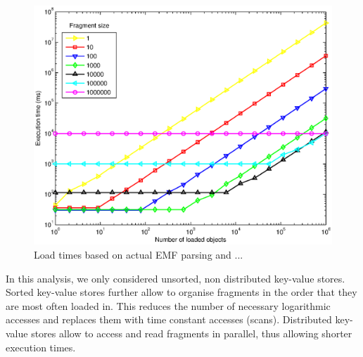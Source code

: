 \begin{figure}
\centering
\includegraphics[width=0.65\linewidth]{figures/fragTheory}
\caption{Load times based on actual EMF parsing and ...}
\end{figure}

In this analysis, we only considered unsorted, non distributed key-value stores. Sorted key-value stores further allow to organise fragments in the order that they are most often loaded in. This reduces the number of necessary logarithmic accesses and replaces them with time constant accesses (scans). Distributed key-value stores allow to access and read fragments in parallel, thus allowing shorter execution times. 